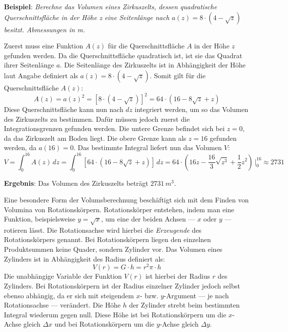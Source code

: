 \pagebreak

\textbf{Beispiel}: \emph{Berechne das Volumen eines Zirkuszelts, dessen quadratische Querschnittsfl\"{a}che in der H\"{o}he z eine Seitenl\"{a}nge nach $a(z) = 8 \cdot (4 - \sqrt{z})$ besitzt. Abmessungen in m.}

Zuerst muss eine Funktion $A(z)$ f\"{u}r die Querschnittsfl\"{a}che $A$ in der H\"{o}he $z$ gefunden werden. Da die Querschnittsfl\"{a}che quadratisch ist, ist sie das Quadrat ihrer Seitenl\"{a}nge $a$. Die Seitenl\"{a}nge des Zirkuszelts ist in Abh\"{a}ngigkeit der H\"{o}he laut Angabe definiert als $a(z) = 8 \cdot (4 - \sqrt{z})$. Somit gilt f\"{u}r die Querschnittsfl\"{a}che $A(z)$: $$A(z) = a(z)^2 = \left[ 8 \cdot (4 - \sqrt{z}) \right]^2 = 64 \cdot (16 -8\sqrt{z} + z)$$ Diese Querschnittsfl\"{a}che kann nun nach $dz$ integriert werden, um so das Volumen des Zirkuszelts zu bestimmen. Daf\"{u}r m\"{u}ssen jedoch zuerst die Integrationsgrenzen gefunden werden. Die untere Grenze befindet sich bei $z = 0$, da das Zirkuszelt am Boden liegt. Die obere Grenze kann als $z = 16$ gefunden werden, da $a(16) = 0$. Das bestimmte Integral liefert nun das Volumen $V$: $$V = \int_{0}^{16} A(z) \, dz = \int_{0}^{16} \left[ 64 \cdot (16 -8\sqrt{z} + z) \right] \, dz = 64 \cdot \left( 16z -\frac{16}{3}\sqrt{z^3} + \frac{1}{2}z^2 \right) \, \bigg|_{0}^{16} \approx 2731$$

\textbf{Ergebnis}: Das Volumen des Zirkuszelts betr\"{a}gt $2731 \, m^3$.


Eine besondere Form der Volumsberechnung besch\"{a}ftigt sich mit dem Finden von Volumina von Rotationsk\"{o}rpern. Rotationsk\"{o}rper entstehen, indem man eine Funktion, beispielsweise $y = \sqrt{x}$, um eine der beiden Achsen --- $x$ oder $y$ --- rotieren l\"{a}sst. Die Rotationsachse wird hierbei die \emph{Erzeugende} des Rotationsk\"{o}rpers genannt. Bei Rotationsk\"{o}rpern liegen den einzelnen Produktsummen keine Quader, sondern Zylinder vor. Das Volumen eines Zylinders ist in Abh\"{a}ngigkeit des Radius definiert als: $$V(r) = G \cdot h = r^2 \pi \cdot h$$ Die unabh\"{a}ngige Variable der Funktion $V(r)$ ist hierbei der Radius $r$ des Zylinders. Bei Rotationsk\"{o}rpern ist der Radius einzelner Zylinder jedoch selbst ebenso abh\"{a}ngig, da er sich mit steigendem $x$- bzw. $y$-Argument --- je nach Rotationsachse --- ver\"{a}ndert. Die H\"{o}he $h$ der Zylinder strebt beim bestimmten Integral wiederum gegen null. Diese H\"{o}he ist bei Rotationsk\"{o}rpern um die $x$-Achse gleich $\Delta x$ und bei Rotationsk\"{o}rpern um die $y$-Achse gleich $\Delta y$.

